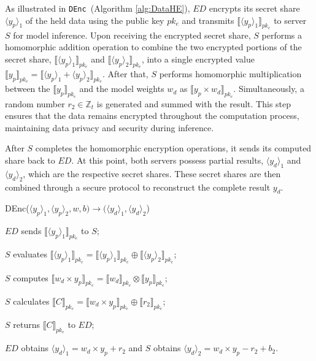 ﻿\documentclass[conference]{IEEEtran}
\newcommand{\DEnc}{\texttt{DEnc}}
\begin{document}
As illustrated in \DEnc~(Algorithm \ref{alg:DataHE}), $ED$ encrypts its secret share $\langle y_p \rangle_1$ of the held data using the public key $pk_e$ and transmits $\llbracket\langle y_p \rangle_1\rrbracket_{pk_e}$ to server $S$ for model inference. Upon receiving the encrypted secret share, $S$ performs a homomorphic addition operation to combine the two encrypted portions of the secret share, $\llbracket\langle y_p \rangle_1\rrbracket_{pk_e}$ and $\llbracket\langle y_p \rangle_2\rrbracket_{pk_e}$, into a single encrypted value $\llbracket y_p \rrbracket_{pk_e}=\llbracket \langle y_p \rangle_1 +  \langle y_p \rangle_2\rrbracket_{pk_e}$. After that, $S$ performs homomorphic multiplication between the $\llbracket y_p \rrbracket_{pk_e}$ and the model weights $w_d$ as $\llbracket y_p\times w_d \rrbracket_{pk_e}$. Simultaneously, a random number $r_2 \in \mathbb{Z}_t$ is generated and summed with the result. This step ensures that the data remains encrypted throughout the computation process, maintaining data privacy and security during inference.

After $S$ completes the homomorphic encryption operations, it sends its computed share back to $ED$. At this point, both servers possess partial results, $\langle y_d \rangle_1$ and $\langle y_d \rangle_2$, which are the respective secret shares. These secret shares are then combined through a secure protocol to reconstruct the complete result $y_d$.
\begin{algorithm}[htbp]
	\caption{DEnc($\langle y_p \rangle_1,\langle y_p \rangle_2,w,b) \rightarrow (\langle y_d\rangle_1,\langle y_d\rangle_2$)}
    \label{alg:DataHE}
    \LinesNumbered
    $ED$ sends $\llbracket\langle y_p \rangle_1\rrbracket_{pk_e}$ to $S$;

    $S$ evaluates $\llbracket\langle y_p \rangle_1\rrbracket_{pk_e} = \llbracket \langle y_p \rangle_1 \rrbracket_{pk_e}  \oplus  \llbracket\langle y_p\rangle_2\rrbracket_{pk_e}$;

    $S$ computes $\llbracket w_d \times y_p \rrbracket_{pk_e} = \llbracket w_d \rrbracket_{pk_e} \otimes \llbracket  y_p \rrbracket_{pk_e}$;

    $S$ calculates $\llbracket C \rrbracket_{pk_e} = \llbracket w_d \times y_p \rrbracket_{pk_e} \oplus \llbracket r_2 \rrbracket_{pk_e}$;

    $S$ returns $\llbracket C \rrbracket_{pk_e}$ to $ED$;

    $ED$ obtains $\langle y_d\rangle_1=w_d \times y_p+r_2$ and $S$ obtains $\langle y_d \rangle_2 = w_d \times y_p-r_2+b_2$.
\end{algorithm}
\end{document}
